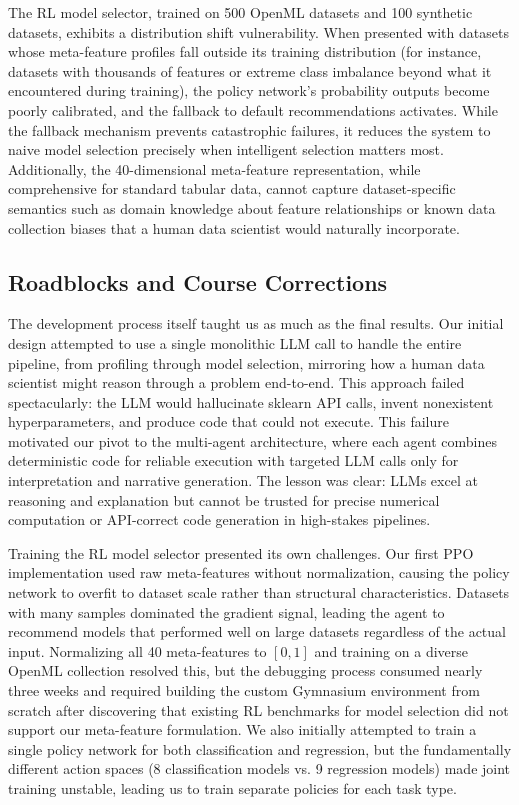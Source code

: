 \documentclass{article}
\begin{document}
The RL model selector, trained on 500 OpenML datasets and 100 synthetic datasets, exhibits a distribution shift vulnerability. When presented with datasets whose meta-feature profiles fall outside its training distribution (for instance, datasets with thousands of features or extreme class imbalance beyond what it encountered during training), the policy network's probability outputs become poorly calibrated, and the fallback to default recommendations activates. While the fallback mechanism prevents catastrophic failures, it reduces the system to naive model selection precisely when intelligent selection matters most. Additionally, the 40-dimensional meta-feature representation, while comprehensive for standard tabular data, cannot capture dataset-specific semantics such as domain knowledge about feature relationships or known data collection biases that a human data scientist would naturally incorporate.

\subsection{Roadblocks and Course Corrections}

The development process itself taught us as much as the final results. Our initial design attempted to use a single monolithic LLM call to handle the entire pipeline, from profiling through model selection, mirroring how a human data scientist might reason through a problem end-to-end. This approach failed spectacularly: the LLM would hallucinate sklearn API calls, invent nonexistent hyperparameters, and produce code that could not execute. This failure motivated our pivot to the multi-agent architecture, where each agent combines deterministic code for reliable execution with targeted LLM calls only for interpretation and narrative generation. The lesson was clear: LLMs excel at reasoning and explanation but cannot be trusted for precise numerical computation or API-correct code generation in high-stakes pipelines.

Training the RL model selector presented its own challenges. Our first PPO implementation used raw meta-features without normalization, causing the policy network to overfit to dataset scale rather than structural characteristics. Datasets with many samples dominated the gradient signal, leading the agent to recommend models that performed well on large datasets regardless of the actual input. Normalizing all 40 meta-features to $[0,1]$ and training on a diverse OpenML collection resolved this, but the debugging process consumed nearly three weeks and required building the custom Gymnasium environment from scratch after discovering that existing RL benchmarks for model selection did not support our meta-feature formulation. We also initially attempted to train a single policy network for both classification and regression, but the fundamentally different action spaces (8 classification models vs. 9 regression models) made joint training unstable, leading us to train separate policies for each task type.
\end{document}
